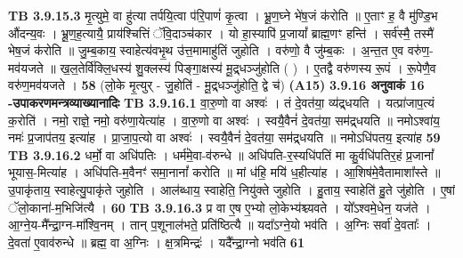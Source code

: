 \documentclass[17pt]{extarticle}
\begin{document}
{{{{{{{{{{{{{{{{{{{{{{                  \newline
                                \textbf{ TB 3.9.15.3} \newline
                  मृ॒त्युमे॒ वा हु॑त्या तर्पयि॒त्वा प॑रि॒पाणं॑ कृ॒त्वा । भ्रू॒ण॒घ्ने भे॑ष॒जं क॑रोति ॥ ए॒ताꣳ ह॒ वै मु॑ण्डि॒भ औ॑दन्य॒वः । भ्रू॒ण॒ह॒त्यायै॒ प्राय॑श्चित्तिं ॅवि॒दाञ्च॑कार । यो हा॒स्यापि॑ प्र॒जायां᳚ ब्राह्म॒णꣳ हन्ति॑ । सर्व॑स्मै॒ तस्मै॑ भेष॒जं क॑रोति ॥ जु॒म्ब॒काय॒ स्वाहेत्य॑वभृ॒थ उ॑त्त॒मामाहु॑तिं जुहोति । वरु॑णो॒ वै जु॑म्ब॒कः । अ॒न्त॒त ए॒व वरु॑ण॒-मव॑यजते ॥ ख॒ल॒तेर्वि॑क्लि॒धस्य॑ शु॒क्लस्य॑ पिङ्गा॒क्षस्य॑ मू॒द्र्धञ्जु॑होति ( ) । ए॒तद्वै वरु॑णस्य रू॒पं । रू॒पेणै॒व वरु॑ण॒मव॑यजते । \textbf{ 58} \newline
                  \newline
                                    (लो॒के मृ॒त्युर् - जु॒होति॑ - मू॒द्र्धञ्जु॑होति॒ द्वे च॑) \textbf{(A15)} \newline \newline
                \textbf{ 3.9.16    अनुवाकं   16 -उपाकरणमन्त्रव्याख्यानादिः} \newline
                                \textbf{ TB 3.9.16.1} \newline
                  वा॒रु॒णो वा अश्वः॑ । तं दे॒वत॑या॒ व्य॑द्र्धयति । यत्प्रा॑जाप॒त्यं क॒रोति॑ । नमो॒ राज्ञे॒ नमो॒ वरु॑णा॒येत्या॑ह । वा॒रु॒णो वा अश्वः॑ । स्वयै॒वैनं॑ दे॒वत॑या॒ सम॑द्र्धयति ॥ नमोऽश्वा॑य॒ नमः॑ प्र॒जाप॑तय॒ इत्या॑ह । प्रा॒जा॒प॒त्यो वा अश्वः॑ । स्वयै॒वैनं॑ दे॒वत॑या॒ सम॑द्र्धयति ॥ नमोऽधि॑पतय॒ इत्या॑ह \textbf{ 59} \newline
                  \newline
                                \textbf{ TB 3.9.16.2} \newline
                  धर्मो॒ वा अधि॑पतिः । धर्म॑मे॒वा-व॑रुन्धे ॥ अधि॑पति-र॒स्यधि॑पतिं मा कु॒र्वधि॑पतिर॒हं प्र॒जानां᳚ भूयास॒-मित्या॑ह । अधि॑पति-म॒वैनꣳ॑ समा॒नानां᳚ करोति ॥ मां ध॑हि॒ मयि॑ ध॒हीत्या॑ह । आ॒शिष॑मे॒वैतामाशा᳚स्ते ॥ उ॒पाकृ॑ताय॒ स्वाहेत्यु॒पाकृ॑ते जुहोति । आल॑ब्धाय॒ स्वाहेति॒ नियु॑क्ते जुहोति । हु॒ताय॒ स्वाहेति॑ हु॒ते जु॑होति । ए॒षां ॅलो॒काना॑-म॒भिजि॑त्यै । \textbf{ 60} \newline
                  \newline
                                \textbf{ TB 3.9.16.3} \newline
                  प्र वा ए॒ष ए॒भ्यो लो॒केभ्य॑श्च्यवते । यो᳚ऽश्वमे॒धेन॒ यज॑ते । आ॒ग्ने॒य-मै᳚न्द्रा॒ग्न-मा᳚श्वि॒नम् । तान् प॒शूनाल॑भते॒ प्रति॑ष्ठित्यै ॥ यदा᳚ऽग्ने॒यो भव॑ति । अ॒ग्निः सर्वा॑ दे॒वताः᳚ । दे॒वता॑ ए॒वाव॑रुन्धे ॥ ब्रह्म॒ वा अ॒ग्निः । क्ष॒त्रमिन्द्रः॑ । यदै᳚न्द्रा॒ग्नो भव॑ति \textbf{ 61} \newline
}}}}}}}}}}}}}}}}}}}}}}
\end{document}
